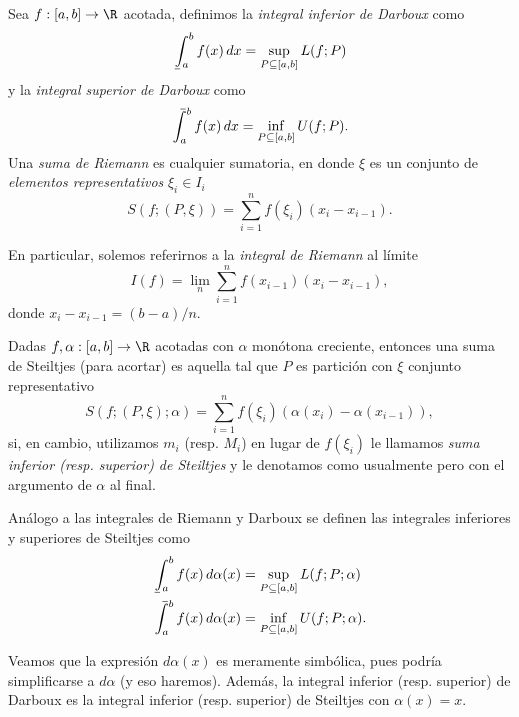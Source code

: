 \documentclass[11pt,oneside,a4paper]{book}
\def\upint{\mathchoice%
    {\mkern13mu\overline{\vphantom{\intop}\mkern7mu}\mkern-20mu}%
    {\mkern7mu\overline{\vphantom{\intop}\mkern7mu}\mkern-14mu}%
    {\mkern7mu\overline{\vphantom{\intop}\mkern7mu}\mkern-14mu}%
    {\mkern7mu\overline{\vphantom{\intop}\mkern7mu}\mkern-14mu}%
  \int}
\def\lowint{\mkern3mu\underline{\vphantom{\intop}\mkern7mu}\mkern-10mu\int}
\begin{document}
\begin{mydef}
Sea $f:[a,b]\rightarrow\R$ acotada, definimos la \textit{integral inferior de Darboux} como
$$\lowint_a^bf(x)\,dx=\sup_{P\subseteq[a,b]}L(f;P)$$
y la \textit{integral superior de Darboux} como
$$\upint_a^bf(x)\,dx=\inf_{P\subseteq[a,b]}U(f;P).$$
Una \textit{suma de Riemann} es cualquier sumatoria, en donde $\xi$ es un conjunto de \textit{elementos representativos} $\xi_i\in I_i$
$$S(f;(P,\xi))=\sum_{i=1}^nf(\xi_i)(x_i-x_{i-1}).$$ 
\end{mydef}
En particular, solemos referirnos a la \textit{integral de Riemann} al límite
$$I(f)=\lim_n\sum_{i=1}^nf(x_{i-1})(x_i-x_{i-1}),$$
donde $x_i-x_{i-1}=(b-a)/n$.
\begin{mydef}
Dadas $f,\alpha:[a,b]\rightarrow\R$ acotadas con $\alpha$ monótona creciente, entonces una suma de Steiltjes (para acortar) es aquella tal que $P$ es partición con $\xi$ conjunto representativo
$$S(f;(P,\xi);\alpha)=\sum_{i=1}^n f(\xi_i)(\alpha(x_i)-\alpha(x_{i-1})),$$
si, en cambio, utilizamos $m_i$ (resp. $M_i$) en lugar de $f(\xi_i)$ le llamamos \textit{suma inferior (resp. superior) de Steiltjes} y le denotamos como usualmente pero con el argumento de $\alpha$ al final.

Análogo a las integrales de Riemann y Darboux se definen las integrales inferiores y superiores de Steiltjes como
\begin{align*}
\lowint_a^bf(x)\,d\alpha(x)&=\sup_{P\subseteq[a,b]}L(f;P;\alpha)\\
\upint_a^bf(x)\,d\alpha(x)&=\inf_{P\subseteq[a,b]}U(f;P;\alpha).
\end{align*}
\end{mydef}
Veamos que la expresión $d\alpha(x)$ es meramente simbólica, pues podría simplificarse a $d\alpha$ (y eso haremos). Además, la integral inferior (resp. superior) de Darboux es la integral inferior (resp. superior) de Steiltjes con $\alpha(x)=x$.
\end{document}
